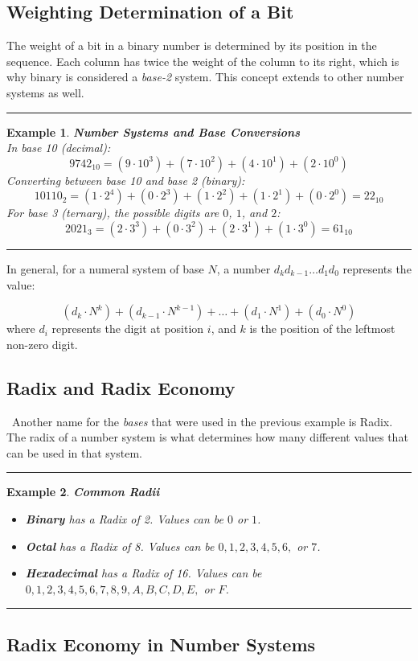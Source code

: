 \documentclass[12pt]{report}
\newtheorem{example}{Example}
\newenvironment{examp}
{
    \vspace{0.5cm}
    \hrule
    \begin{example}
}
{
    \hrule
    \vspace{0.5cm}
    \end{example}
}
\begin{document}
\subsection*{Weighting Determination of a Bit}
The weight of a bit in a binary number is determined by its position in the sequence. Each column has twice the weight of the column to its right, which is why binary is considered a \textit{base-2} system. This concept extends to other number systems as well.
\begin{examp}
	\textbf{Number Systems and Base Conversions} \\
	In base 10 (decimal):
	\[9742_{10} = (9 \cdot 10^3) + (7 \cdot 10^2) + (4 \cdot 10^1) + (2 \cdot 10^0)\]
	Converting between base 10 and base 2 (binary):
	\[10110_2 = (1 \cdot 2^4) + (0 \cdot 2^3) + (1 \cdot 2^2) + (1 \cdot 2^1) + (0 \cdot 2^0) = 22_{10}\]
	For base 3 (ternary), the possible digits are $0$, $1$, and $2$:
	\[2021_3 = (2 \cdot 3^3) + (0 \cdot 3^2) + (2 \cdot 3^1) + (1 \cdot 3^0) = 61_{10}\]
\end{examp}
In general, for a numeral system of base $N$, a number $d_k d_{k-1} \ldots d_1 d_0$ represents the value:

\[ (d_k \cdot N^k) + (d_{k-1} \cdot N^{k-1}) + \ldots + (d_1 \cdot N^1) + (d_0 \cdot N^0) \]
where $d_i$ represents the digit at position $i$, and $k$ is the position of the leftmost non-zero digit.
\subsection*{Radix and Radix Economy} \
Another name for the \textit{bases} that were used in the previous example is Radix. The radix of a number system is what determines how many different values that can be used in that system.
\begin{examp}
	\textbf{Common Radii}
	\begin{itemize}
		\item \textbf{Binary} has a Radix of 2. Values can be $0$ or $1$.
		\item \textbf{Octal} has a Radix of 8. Values can be $0, 1, 2, 3, 4, 5, 6,$ or $7$.
		\item \textbf{Hexadecimal} has a Radix of 16. Values can be $0, 1, 2, 3, 4, 5, 6, 7, 8, 9, A, B, C, D, E,$ or $F$.
	\end{itemize}
\end{examp}
\subsection*{Radix Economy in Number Systems}
\end{document}
